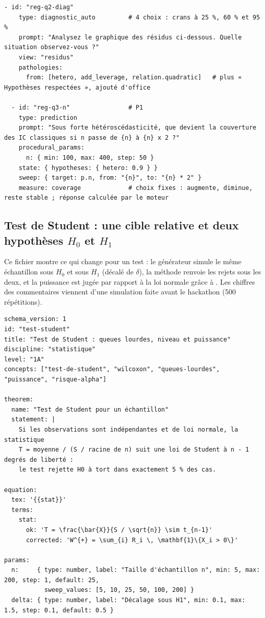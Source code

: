 \documentclass[11pt,a4paper]{article}
\begin{document}
\begin{appendices}
\begin{lstlisting}[caption={Fichier de référence \texttt{experiments/regression\_lineaire.yaml}.}]
  - id: "reg-q2-diag"
    type: diagnostic_auto         # 4 choix : crans à 25 %, 60 % et 95 %
    prompt: "Analysez le graphique des résidus ci-dessous. Quelle situation observez-vous ?"
    view: "residus"
    pathologies:
      from: [hetero, add_leverage, relation.quadratic]   # plus « Hypothèses respectées », ajouté d'office

  - id: "reg-q3-n"                # P1
    type: prediction
    prompt: "Sous forte hétéroscédasticité, que devient la couverture des IC classiques si n passe de {n} à {n} x 2 ?"
    procedural_params:
      n: { min: 100, max: 400, step: 50 }
    state: { hypotheses: { hetero: 0.9 } }
    sweep: { target: p.n, from: "{n}", to: "{n} * 2" }
    measure: coverage             # choix fixes : augmente, diminue, reste stable ; réponse calculée par le moteur
\end{lstlisting}

\subsection{Test de Student : une cible relative et deux hypothèses \texorpdfstring{$H_0$ et $H_1$}{H0 et H1}}\label{ann:yaml-student}
Ce fichier montre ce qui change pour un test : le générateur simule le même échantillon sous $H_0$ et sous $H_1$ (décalé de $\delta$), la méthode renvoie les rejets sous les deux, et la puissance est jugée par rapport à la loi normale grâce à . Les chiffres des commentaires viennent d'une simulation faite avant le hackathon (500 répétitions).

\begin{lstlisting}[caption={Fichier de référence \texttt{experiments/test\_student.yaml}.}]
schema_version: 1
id: "test-student"
title: "Test de Student : queues lourdes, niveau et puissance"
discipline: "statistique"
level: "1A"
concepts: ["test-de-student", "wilcoxon", "queues-lourdes", "puissance", "risque-alpha"]

theorem:
  name: "Test de Student pour un échantillon"
  statement: |
    Si les observations sont indépendantes et de loi normale, la statistique
    T = moyenne / (S / racine de n) suit une loi de Student à n - 1 degrés de liberté :
    le test rejette H0 à tort dans exactement 5 % des cas.

equation:
  tex: '{{stat}}'
  terms:
    stat:
      ok: 'T = \frac{\bar{X}}{S / \sqrt{n}} \sim t_{n-1}'
      corrected: 'W^{+} = \sum_{i} R_i \, \mathbf{1}\{X_i > 0\}'

params:
  n:     { type: number, label: "Taille d'échantillon n", min: 5, max: 200, step: 1, default: 25,
           sweep_values: [5, 10, 25, 50, 100, 200] }
  delta: { type: number, label: "Décalage sous H1", min: 0.1, max: 1.5, step: 0.1, default: 0.5 }


\end{lstlisting}
\end{appendices}
\end{document}
